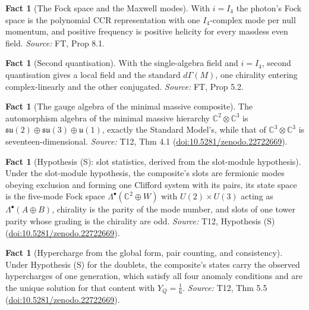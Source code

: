 \documentclass[11pt]{article}
\theoremstyle{definition}
\newtheorem{fact}[theorem]{Fact}
\theoremstyle{plain}
\providecommand{\C}{}\renewcommand{\C}{\mathbb{C}}
\providecommand{\su}{}\renewcommand{\su}{\mathfrak{su}}
\providecommand{\uu}{}\renewcommand{\uu}{\mathfrak{u}}
\begin{document}
\begin{fact}[The Fock space and the Maxwell modes]\label{c:field-theory.fock-space-maxwell-modes}
With $i = I_4$ the photon's Fock space is the polynomial CCR representation with one $I_4$-complex mode per null momentum, and positive frequency is positive helicity for every massless even field.
\emph{Source:} FT, Prop 8.1.
\end{fact}

\begin{fact}[Second quantisation]\label{c:field-theory.second-quantisation}
With the single-algebra field and $i = I_4$, second quantisation gives a local field and the standard $d\Gamma(M)$, one chirality entering complex-linearly and the other conjugated.
\emph{Source:} FT, Prop 5.2.
\end{fact}

\begin{fact}[The gauge algebra of the minimal massive composite]\label{c:standard-model.gauge-algebra-minimal-massive-composite}
The automorphism algebra of the minimal massive hierarchy $\C^{2} \otimes \C^{3}$ is $\su(2) \oplus \su(3) \oplus \uu(1)$, exactly the Standard Model's, while that of $\C^{3} \otimes \C^{3}$ is seventeen-dimensional.
\emph{Source:} T12, Thm 4.1 (\href{https://doi.org/10.5281/zenodo.22722669}{doi:10.5281/zenodo.22722669}).
\end{fact}

\begin{fact}[Hypothesis (S): slot statistics, derived from the slot-module hypothesis]\label{c:standard-model.hyp-s-slot-statistics}
Under the slot-module hypothesis, the composite's slots are fermionic modes obeying exclusion and forming one Clifford system with its pairs, its state space is the five-mode Fock space $\Lambda^{\bullet}(\C^{2} \oplus W)$ with $U(2) \times U(3)$ acting as $\Lambda^{\bullet}(A \oplus B)$, chirality is the parity of the mode number, and slots of one tower parity whose grading is the chirality are odd.
\emph{Source:} T12, Hypothesis (S) (\href{https://doi.org/10.5281/zenodo.22722669}{doi:10.5281/zenodo.22722669}).
\end{fact}

\begin{fact}[Hypercharge from the global form, pair counting, and consistency]\label{c:standard-model.hypercharge-global-form-pair-counting-consistency}
Under Hypothesis (S) for the doublets, the composite's states carry the observed hypercharges of one generation, which satisfy all four anomaly conditions and are the unique solution for that content with $Y_{Q} = \tfrac16$.
\emph{Source:} T12, Thm 5.5 (\href{https://doi.org/10.5281/zenodo.22722669}{doi:10.5281/zenodo.22722669}).
\end{fact}
\end{document}
